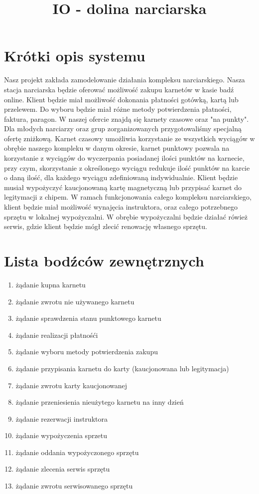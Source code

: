 \documentclass{sprawozdanie-agh}
\title{IO - dolina narciarska}
\begin{document}

\stronatytulowa{}

\section{Krótki opis systemu}
\large
Nasz projekt zakłada zamodelowanie działania kompleksu narciarskiego. Nasza stacja narciarska będzie oferować możliwość zakupu karnetów w kasie badź online. Klient będzie miał możliwość dokonania płatności gotówką, kartą lub przelewem. Do wyboru będzie miał różne metody potwierdzenia płatności, faktura, paragon. W naszej ofercie znajdą się karnety czasowe oraz "na punkty". Dla młodych narciarzy oraz grup zorganizowanych przygotowaliśmy specjalną ofertę zniżkową. Karnet czasowy umożliwia korzystanie ze wszystkich wyciągów w obrębie naszego kompleku w danym okresie, karnet punktowy pozwala na korzystanie z wyciągów do wyczerpania posiadanej ilości punktów na karnecie, przy czym, skorzystanie z określonego wyciągu redukuje ilość punktów na karcie o daną ilość, dla każdego wyciągu zdefiniowaną indywidualnie. Klient będzie musiał wypożyczyć kaucjonowaną kartę magnetyczną lub przypisać karnet do legitymacji z chipem. W ramach funkcjonowania całego kompleksu narciarskiego, klient będzie miał możliwość wynajęcia instruktora, oraz całego potrzebnego sprzętu w lokalnej wypożyczalni. W obrębie wypożyczalni będzie działać rówież serwis, gdzie klient będzie mógł zlecić renowację własnego sprzętu.

\section{Lista bodźców zewnętrznych}
\begin{enumerate}
	\item żądanie kupna karnetu
	\item żądanie zwrotu nie używanego karnetu
	\item żądanie sprawdzenia stanu punktowego karnetu
	\item żądanie realizacji płatnośći
	\item żądanie wyboru metody potwierdzenia zakupu
	\item żądanie przypisania karnetu do karty (kaucjonowana lub legitymacja)
	\item żądanie zwrotu karty kaucjonowanej
	\item żądanie przeniesienia nieużytego karnetu na inny dzień
	\item żądanie rezerwacji instruktora
	\item żądanie wypożyczenia sprzetu
	\item żądanie oddania wypożyczonego sprzętu
	\item żądanie zlecenia serwis sprzętu
	\item żądanie zwrotu serwisowanego sprzętu
\end{enumerate}
\end{document}
